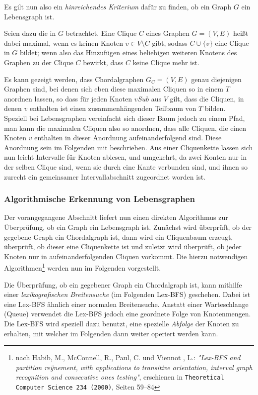 Es gilt nun also ein \emph{hinreichendes Kriterium} dafür zu finden, ob ein Graph $G$ ein Lebensgraph ist.

Seien dazu die  in $G$ betrachtet. Eine Clique $C$ eines Graphen $G = (V,E)$ heißt dabei maximal, wenn es keinen Knoten $v \in V\setminus C$ gibt, sodass $C \cup \{ v \}$ eine Clique in $G$ bildet; wenn also das Hinzufügen eines beliebigen weiteren Knotens des Graphen zu der Clique $C$ bewirkt, dass $C$ keine Clique mehr ist.

Es kann gezeigt werden, dass Chordalgraphen $G_C = (V,E)$ genau diejenigen Graphen sind, bei denen sich eben diese maximalen Cliquen so in einem  $T$ anordnen lassen, so dass für jeden Knoten $vSub$ aus $V$ gilt, dass die Cliquen, in denen $v$ enthalten ist einen zusammenhängenden Teilbaum von $T$ bilden.\\
Speziell bei Lebensgraphen vereinfacht sich dieser Baum jedoch zu einem Pfad, man kann die maximalen Cliquen also so anordnen, dass alle Cliquen, die einen Knoten $v$ enthalten in dieser Anordnung aufeinanderfolgend sind. Diese Anordnung sein im Folgenden mit  beschrieben. Aus einer Cliquenkette lassen sich nun leicht Intervalle für Knoten ablesen, und umgekehrt, da zwei Konten nur in der selben Clique sind, wenn sie durch eine Kante verbunden sind, und ihnen so zurecht ein gemeinsamer Intervallabschnitt zugeordnet worden ist.

\subsubsection{Algorithmische Erkennung von Lebensgraphen}

Der vorangegangene Abschnitt liefert nun einen direkten Algorithmus zur Überprüfung, ob ein Graph ein Lebensgraph ist. Zunächst wird überprüft, ob der gegebene Graph ein Chordalgraph ist, dann wird ein Cliquenbaum erzeugt, überprüft, ob dieser eine Cliquenkette ist und zuletzt wird überprüft, ob jeder Knoten nur in aufeinanderfolgenden Cliquen vorkommt. Die hierzu notwendigen Algorithmen\footnote{nach Habib, M., McConnell, R., Paul, C. und Viennot , L.: \textit{"Lex-BFS and partition reÿnement, with applications to transitive orientation, interval graph recognition and consecutive ones testing"}, erschienen in \texttt{Theoretical Computer Science 234 (2000)}, Seiten 59–84} werden nun im Folgenden vorgestellt.

Die Überprüfung, ob ein gegebener Graph ein Chordalgraph ist, kann mithilfe einer \emph{lexikografischen Breitensuche} (im Folgenden Lex-BFS) geschehen. Dabei ist eine Lex-BFS ähnlich einer normalen Breitensuche. Anstatt einer Warteschlange (Queue) verwendet die Lex-BFS jedoch eine geordnete Folge von Knotenmengen. Die Lex-BFS wird speziell dazu benutzt, eine spezielle \emph{Abfolge} der Knoten zu erhalten, mit welcher im Folgenden dann weiter operiert werden kann.


